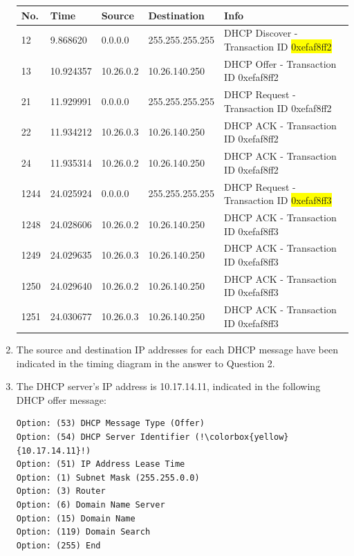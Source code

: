 \documentclass{article}
\begin{document}
\begin{enumerate}
    \begin{tabular}{@{}lllll@{}}
    \toprule
    No.  & Time      & Source    & Destination     & Info                                      \\ \midrule
    12   & 9.868620  & 0.0.0.0   & 255.255.255.255 & DHCP Discover - Transaction ID \colorbox{yellow}{0xefaf8ff2} \\
    13   & 10.924357 & 10.26.0.2 & 10.26.140.250   & DHCP Offer    - Transaction ID 0xefaf8ff2 \\
    21   & 11.929991 & 0.0.0.0   & 255.255.255.255 & DHCP Request  - Transaction ID 0xefaf8ff2 \\
    22   & 11.934212 & 10.26.0.3 & 10.26.140.250   & DHCP ACK      - Transaction ID 0xefaf8ff2 \\
    24   & 11.935314 & 10.26.0.2 & 10.26.140.250   & DHCP ACK      - Transaction ID 0xefaf8ff2 \\
    1244 & 24.025924 & 0.0.0.0   & 255.255.255.255 & DHCP Request  - Transaction ID \colorbox{yellow}{0xefaf8ff3} \\
    1248 & 24.028606 & 10.26.0.2 & 10.26.140.250   & DHCP ACK      - Transaction ID 0xefaf8ff3 \\
    1249 & 24.029635 & 10.26.0.3 & 10.26.140.250   & DHCP ACK      - Transaction ID 0xefaf8ff3 \\
    1250 & 24.029640 & 10.26.0.2 & 10.26.140.250   & DHCP ACK      - Transaction ID 0xefaf8ff3 \\
    1251 & 24.030677 & 10.26.0.3 & 10.26.140.250   & DHCP ACK      - Transaction ID 0xefaf8ff3 \\ \bottomrule
    \end{tabular}

    \item The source and destination IP addresses for each DHCP message have been indicated in the timing diagram in the answer to Question 2.
    
    \item The DHCP server's IP address is 10.17.14.11, indicated in the following DHCP offer message:
\begin{verbatim}
Option: (53) DHCP Message Type (Offer)
Option: (54) DHCP Server Identifier (!\colorbox{yellow}{10.17.14.11}!)
Option: (51) IP Address Lease Time
Option: (1) Subnet Mask (255.255.0.0)
Option: (3) Router
Option: (6) Domain Name Server
Option: (15) Domain Name
Option: (119) Domain Search
Option: (255) End
\end{verbatim}


\end{enumerate}
\end{document}

